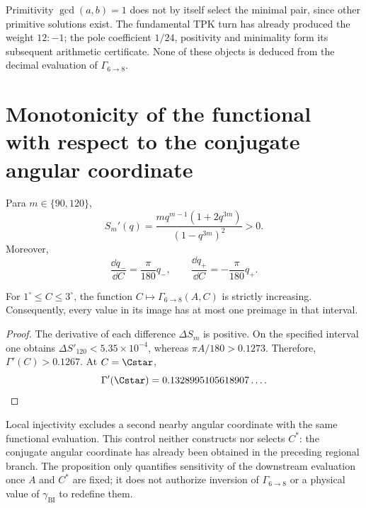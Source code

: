 Primitivity \(\gcd(a,b)=1\) does not by itself select the minimal pair, since
other primitive solutions exist. The fundamental TPK turn has already
produced the weight \(12:-1\); the pole coefficient \(1/24\), positivity and
minimality form its subsequent arithmetic certificate. None of these
objects is deduced from the decimal evaluation of \(\Gamma_{6\to8}\).

\newpage
\section{Monotonicity of the functional with respect to the conjugate angular coordinate}

Para \(m\in\{90,120\}\),
\[
 S_m'(q)=\frac{m q^{m-1}(1+2q^{3m})}{(1-q^{3m})^2}>0.
\]
Moreover,
\[
 \frac{\dd q_-}{\dd C}=\frac\pi{180}q_-,
 \qquad
 \frac{\dd q_+}{\dd C}=-\frac\pi{180}q_+.
\]

\begin{proposition}
For \(1^\circ\leq C\leq3^\circ\), the function
\(C\mapsto\Gamma_{6\to8}(A,C)\) is strictly increasing. Consequently,
every value in its image has at most one preimage in that interval.
\end{proposition}
\begin{proof}
The derivative of each difference \(\Delta S_m\) is positive. On the
specified interval one obtains
\(\Delta S'_{120}<5.35\times10^{-4}\), whereas
\(\pi A/180>0.1273\). Therefore,
\(\Gamma'(C)>0.1267\). At \(C=\Cstar\),
\[
 \Gamma'(\Cstar)=0.1328995105618907\ldots.
\]
\end{proof}

Local injectivity excludes a second nearby angular coordinate with the
same functional evaluation. This control neither constructs nor selects
\(C^*\): the conjugate angular coordinate has already been obtained in the preceding regional branch.
The proposition only quantifies sensitivity of the downstream evaluation
once \(A\) and \(C^*\) are fixed; it does not authorize inversion of
\(\Gamma_{6\to8}\) or a physical value of \(\gamma_{\mathrm{BI}}\) to
redefine them.
